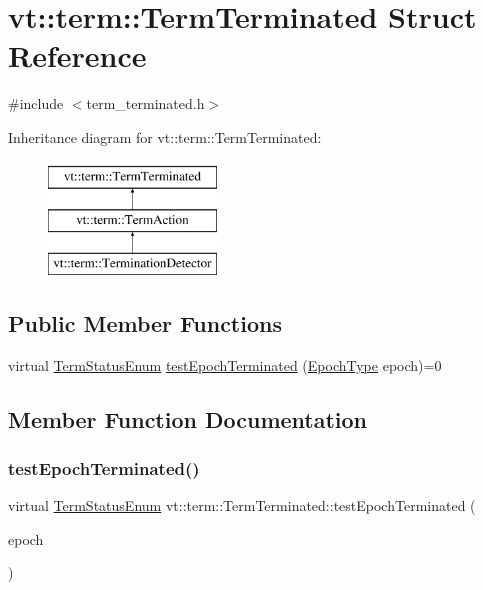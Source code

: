 \hypertarget{structvt_1_1term_1_1_term_terminated}{}\section{vt\+:\+:term\+:\+:Term\+Terminated Struct Reference}
\label{structvt_1_1term_1_1_term_terminated}


{\ttfamily \#include $<$term\+\_\+terminated.\+h$>$}

Inheritance diagram for vt\+:\+:term\+:\+:Term\+Terminated\+:\begin{figure}[H]
\begin{center}
\leavevmode
\includegraphics[height=3.000000cm]{structvt_1_1term_1_1_term_terminated}
\end{center}
\end{figure}
\subsection*{Public Member Functions}
\begin{DoxyCompactItemize}
\item 
virtual \hyperlink{namespacevt_1_1term_ad8ec9b371608fc88e7fdeef219785b27}{Term\+Status\+Enum} \hyperlink{structvt_1_1term_1_1_term_terminated_a9d23b646c13a95738f72f7abfc8774c7}{test\+Epoch\+Terminated} (\hyperlink{namespacevt_a81d11b28122d43bf9834577e4a06440f}{Epoch\+Type} epoch)=0
\end{DoxyCompactItemize}


\subsection{Member Function Documentation}
\mbox{\label{structvt_1_1term_1_1_term_terminated_a9d23b646c13a95738f72f7abfc8774c7}} 
\subsubsection{\texorpdfstring{test\+Epoch\+Terminated()}{testEpochTerminated()}}
{\footnotesize\ttfamily virtual \hyperlink{namespacevt_1_1term_ad8ec9b371608fc88e7fdeef219785b27}{Term\+Status\+Enum} vt\+::term\+::\+Term\+Terminated\+::test\+Epoch\+Terminated (\begin{DoxyParamCaption}\item[{\hyperlink{namespacevt_a81d11b28122d43bf9834577e4a06440f}{Epoch\+Type}}]{epoch }\end{DoxyParamCaption})\hspace{0.3cm}{\ttfamily [pure virtual]}}



